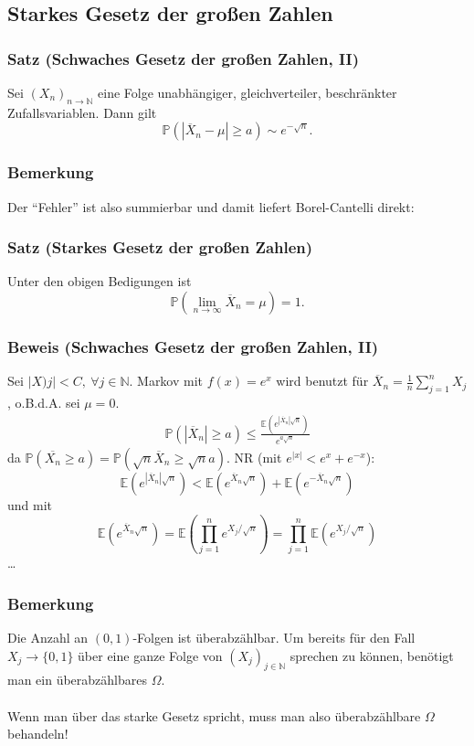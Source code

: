 \subsection{Starkes Gesetz der gro\ss{}en Zahlen}
\subsubsection{Satz (Schwaches Gesetz der gro\ss{}en Zahlen, II)}
Sei $(X_n)_{n\to\mathbb{N}}$ eine Folge unabh\"angiger, gleichverteiler, beschr\"ankter Zufallsvariablen. Dann gilt
\[
\mathbb{P}(|\overline{X}_n-\mu|\geq a)\sim e^{-\sqrt{n}}.
\]
\subsubsection{Bemerkung}
Der ``Fehler'' ist also summierbar und damit liefert Borel-Cantelli direkt:
\subsubsection{Satz (Starkes Gesetz der gro\ss{}en Zahlen)}
Unter den obigen Bedigungen ist
\[
\mathbb{P}(\lim_{n\to\infty}\overline{X}_n=\mu)=1.
\]
\subsubsection{Beweis (Schwaches Gesetz der gro\ss{}en Zahlen, II)}
Sei $|X)j|<C,\ \forall j\in\mathbb{N}$. Markov mit $f(x)=e^x$ wird benutzt f\"ur $\overline{X}_n=\frac{1}{n}\sum_{j=1}^nX_j$, o.B.d.A. sei $\mu=0$.
\begin{align*}
\mathbb{P}(|\overline{X}_n|\geq a)\leq\frac{\mathbb{E}(e^{|\overline{X}_n|\sqrt{n}})}{e^{a\sqrt{n}}}
\end{align*}
da $\mathbb{P}(\overline{X_n}\geq a)=\mathbb{P}(\sqrt{n}\overline{X}_n\geq\sqrt{n}a)$. NR (mit $e^{|x|}<e^x+e^{-x}$):
\[
\mathbb{E}(e^{|\overline{X}_n|\sqrt{n}})
<\mathbb{E}(e^{\overline{X}_n\sqrt{n}})
+\mathbb{E}(e^{-\overline{X}_n\sqrt{n}})
\]
und mit
\[
\mathbb{E}(e^{\overline{X}_n\sqrt{n}})
=
\mathbb{E}(\prod_{j=1}^ne^{X_j/\sqrt{n}})
=
\prod_{j=1}^n\mathbb{E}(e^{X_j/\sqrt{n}})
\]
\ldots\weg
\subsubsection{Bemerkung}
Die Anzahl an $(0,1)$-Folgen ist \"uberabz\"ahlbar. Um bereits f\"ur den Fall $X_j\to\{0,1\}$ \"uber eine ganze Folge von $(X_j)_{j\in\mathbb{N}}$ sprechen zu k\"onnen, ben\"otigt man ein \"uberabz\"ahlbares $\Omega$.
\\~\\
Wenn man \"uber das starke Gesetz spricht, muss man also \"uberabz\"ahlbare $\Omega$ behandeln!
